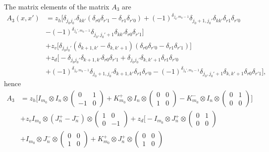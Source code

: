 \documentclass[12pt,reqno]{amsart}
\numberwithin{equation}{section}
\newcommand{\de}{\delta}
\begin{document}
\begin{appendix}
The matrix elements of the matrix $A_3$ are 
\begin{equation}\label{k3m1}
\begin{aligned}
A_3(x,x')&=z_h\big[\de_{j_0j_0'}\de_{kk'}(\de_{r0}\de_{r'1}-\de_{r1}\de_{r'0})
+(-1)^{\de_{j_0,m_0-1}}\de_{j_0+1,j_0'}\de_{kk'}\de_{r1}\de_{r'0}\\
&-(-1)^{\de_{j_0',m_0-1}}\de_{j_0,j_0'+1}\de_{kk'}\de_{r0}\de_{r'1}\big]\\
&+z_v\big[\de_{j_0j_0'}(\de_{k+1,k'}-\de_{k,k'+1})(\de_{r0}\de_{r'0}-\de_{r1}\de_{r'1})\big]\\
&+z_d\big[-\de_{j_0j_0'}\de_{k+1,k'}\de_{r0}\de_{r'1}+\de_{j_0j_0'}\de_{k,k'+1}\de_{r1}\de_{r'0} \\
&+(-1)^{\de_{j_0,m_0-1}}\de_{j_0+1,j_0'}\de_{k+1,k'}\de_{r1}\de_{r'0}
-(-1)^{\de_{j_0',m_0-1}}\de_{j_0,j_0'+1}\de_{k,k'+1}\de_{r0}\de_{r'1} \big],
\end{aligned}
\end{equation}
hence
\begin{equation}\label{k3m2}
\begin{aligned}
A_3&=z_h\Big[I_{m_0}\otimes I_n\otimes
\begin{pmatrix}
0 & 1 \\
-1 & 0
\end{pmatrix}
+K_{m_0}^+\otimes I_n \otimes 
\begin{pmatrix}
0 & 0 \\
1 & 0
\end{pmatrix}
-K_{m_0}^-\otimes I_n \otimes 
\begin{pmatrix}
0 & 1 \\
0 & 0
\end{pmatrix}
\Big]\\
&+z_v I_{m_0}\otimes (J_n^+-J_n^-)\otimes \begin{pmatrix}
1 & 0 \\
0 & -1
\end{pmatrix}
+z_d\bigg[-I_{m_0}\otimes J_n^+\otimes \begin{pmatrix}
0 & 1 \\
0 & 0
\end{pmatrix}\\
&+I_{m_0}\otimes J_n^-\otimes \begin{pmatrix}
0 & 0 \\
1 & 0
\end{pmatrix}
+K_{m_0}^+\otimes J_n^+\otimes \begin{pmatrix}
0 & 0 \\
1 & 0
\end{pmatrix}

\end{aligned}
\end{equation}
\end{appendix}
\end{document}
